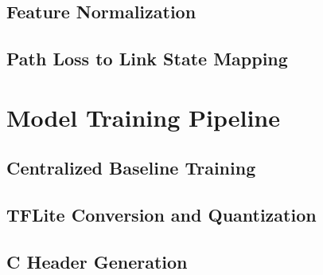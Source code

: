 \subsection{Feature Normalization}

\subsection{Path Loss to Link State Mapping}

\section{Model Training Pipeline}
\label{sec:training-pipeline}

\subsection{Centralized Baseline Training}

\subsection{TFLite Conversion and Quantization}

\subsection{C Header Generation}

